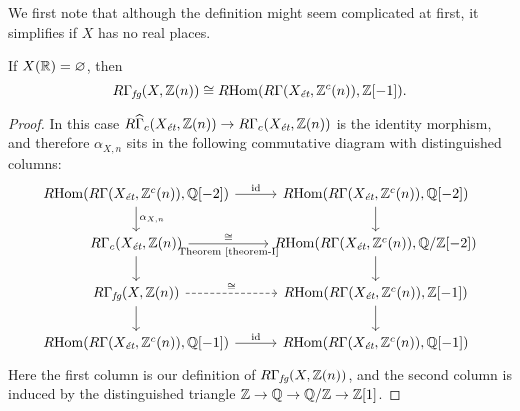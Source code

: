\documentclass{article}
\numberwithin{equation}{section}
\begin{document}
We first note that although the definition might seem complicated at first,
it simplifies if $X$ has no real places.

\begin{proposition}
  \label{prop:RGamma-fg-for-X(R)-empty}
  If $X (\RR) = \emptyset$, then
  \[ R\Gamma_\fg (X, \ZZ (n)) \cong
  \RHom (R\Gamma (X_\et, \ZZ^c (n)), \ZZ [-1]). \]

  \begin{proof}
    In this case
    $R\widehat{\Gamma}_c (X_\et, \ZZ (n)) \to R\Gamma_c (X_\et, \ZZ (n))$
    is the identity morphism, and therefore $\alpha_{X,n}$ sits in the following
    commutative diagram with distinguished columns:
    \[ \begin{tikzcd}
      \RHom (R\Gamma (X_\et, \ZZ^c (n)), \QQ [-2])\ar{d}{\alpha_{X,n}} \ar{r}{\mathrm{id}} & \RHom (R\Gamma (X_\et, \ZZ^c (n)), \QQ [-2])\ar{d} \\
      R\Gamma_c (X_\et, \ZZ (n))\ar{d} \ar{r}{\cong}[swap]{\text{Theorem~\ref{theorem-I}}} & \RHom (R\Gamma (X_\et, \ZZ^c (n)), \QQ/\ZZ [-2])\ar{d} \\
      R\Gamma_\fg (X, \ZZ (n))\ar{d} \ar[dashed]{r}{\cong} & \RHom (R\Gamma (X_\et, \ZZ^c (n)), \ZZ [-1])\ar{d} \\
      \RHom (R\Gamma (X_\et, \ZZ^c (n)), \QQ [-1]) \ar{r}{\mathrm{id}} & \RHom (R\Gamma (X_\et, \ZZ^c (n)), \QQ [-1])
    \end{tikzcd} \]
    Here the first column is our definition of $R\Gamma_\fg (X, \ZZ (n))$,
    and the second column is induced by the distinguished triangle
    $\ZZ \to \QQ \to \QQ/\ZZ \to \ZZ [1]$.
  \end{proof}
\end{proposition}
\end{document}
